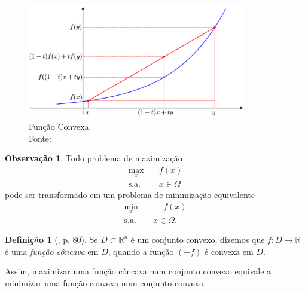 \documentclass[12pt,a4paper]{scrartcl}
\def\RR{\mathds{R}}
\theoremstyle{definition}%
\newtheorem{defi}{Definição}
\newtheorem{obs}{Observação}
\begin{document}
\begin{figure}[!h] 
	\centering
	\includegraphics[width=0.85\textwidth]{funcao_convexa}
	\caption{ Função Convexa. \label{fig_funcao_convexa} \\ Fonte: \textcite{Evelin2017}}
\end{figure}

\begin{obs}
Todo problema de maximização
\[
\begin{aligned}
\max_{x} & \quad f(x) \\
\text{s.a.} & \quad x \in \Omega \end{aligned}
 \]
pode ser transformado em um problema de minimização equivalente
\[
\begin{aligned}
\min_{x} & \quad -f(x) \\
\text{s.a.} & \quad x \in \Omega .\end{aligned}
 \]
\end{obs}

\begin{defi} [\textcite{Izmailov2014ac}, p. 80]
Se $D \subset \RR^{n}$ é um conjunto convexo, dizemos que $f: D \longrightarrow \RR $ é uma \emph{função côncava} em $D$, quando a função $(-f)$ é convexa em $D$.
\end{defi}

Assim, maximizar uma função côncava num conjunto convexo equivale a minimizar uma função convexa num conjunto convexo.

\newpage

\printbibliography
\end{document}
